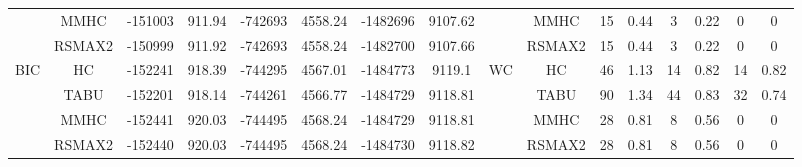 \begin{table}[p]
{\begin{tabular}{cc||cc|cc|cc||cc|cc|cc|cc}
& MMHC &	-151003 & 	911.94 & 	-742693 & 	4558.24 & 	-1482696 & 	9107.62 & 	& MMHC &	15 & 	0.44 & 	3 & 	0.22 & 	0 & 	0\tabularnewline													
& RSMAX2 &	-150999 & 	911.92 & 	-742693 & 	4558.24 & 	-1482700 & 	9107.66 & 	& RSMAX2 &	15 & 	0.44 & 	3 & 	0.22 & 	0 & 	0\tabularnewline													
\hline																										
\multirow{4}{*}{BIC} & HC &	-152241 & 	918.39 & 	-744295 & 	4567.01 & 	-1484773 & 	9119.1 & 	\multirow{4}{*}{WC} & HC &	46 & 	1.13 & 	14 & 	0.82 & 	14 & 	0.82\tabularnewline													
& TABU &	-152201 & 	918.14 & 	-744261 & 	4566.77 & 	-1484729 & 	9118.81 & 	& TABU &	90 & 	1.34 & 	44 & 	0.83 & 	32 & 	0.74\tabularnewline													
& MMHC &	-152441 & 	920.03 & 	-744495 & 	4568.24 & 	-1484729 & 	9118.81 & 	& MMHC &	28 & 	0.81 & 	8 & 	0.56 & 	0 & 	0\tabularnewline													
& RSMAX2 &	-152440 & 	920.03 & 	-744495 & 	4568.24 & 	-1484730 & 	9118.82 & 	& RSMAX2 &	28 & 	0.81 & 	8 & 	0.56 & 	0 & 	0\tabularnewline													
\hline																										
\end{tabular}																										
}																										
\end{table}																										


